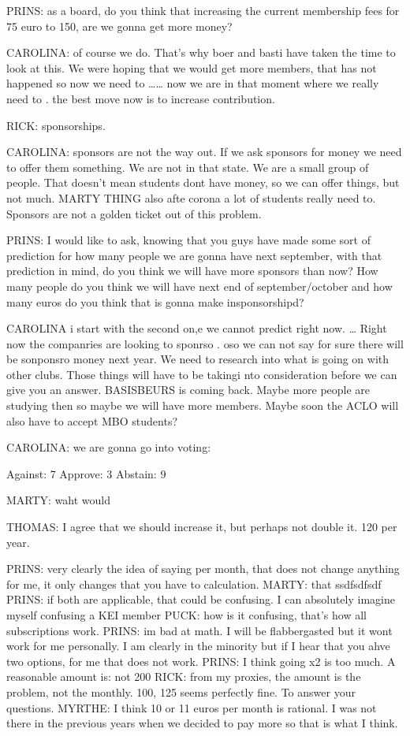 \documentclass[12pt, a4paper]{article}
\begin{document}
PRINS: as a board, do you think that increasing the current membership fees for 75 euro to 150, are we gonna get more money?

CAROLINA: of course we do. That’s why boer and basti have taken the time to look at this. We were hoping that we would get more members, that has not happened so now we need to …… now we are in that moment where we really need to . the best move now is to increase contribution. 

RICK: sponsorships. 

CAROLINA: sponsors are not the way out. If we ask sponsors for money we need to offer them something. We are not in that state. We are a small group of people. That doesn’t mean students dont have money, so we can offer things, but not much. MARTY THING also afte corona a lot of students really need to. Sponsors are not a golden ticket out of this problem.

PRINS: I would like to ask, knowing that you guys have made some sort of prediction for how many people we are gonna have next september, with that prediction in mind, do you think we will have more sponsors than now? How many people do you think we will have next end of september/october and how many euros do you think that is gonna make insponsorshipd?

CAROLINA i start with the second on,e we cannot predict right now. … Right now the companries are looking to sponrso . oso we can not say for sure there will be  sonponsro money next year. We need to research into what is going on with other clubs. Those things will have to be takingi nto consideration before we can give you an answer. BASISBEURS is coming back. Maybe more people are studying then so maybe we will have more members. Maybe soon the ACLO will also have to accept MBO students?

CAROLINA: we are gonna go into voting:

Against: 7
Approve: 3 
Abstain: 9

MARTY: waht would

THOMAS: I agree that we should increase it, but perhaps not double it. 120 per year.

PRINS: very clearly the idea of saying per month, that does not change anything for me, it only changes that you have to calculation.
MARTY: that ssdfsdfsdf
PRINS: if both are applicable, that could be confusing. I can absolutely imagine myself confusing a KEI member
PUCK: how is it confusing, that’s how all subscriptions work.
PRINS: im bad at math. I will be flabbergasted but it wont work for me personally. I am clearly in the minority but if I hear that you ahve two options, for me that does not work.
PRINS: I think going x2 is too much. A reasonable amount is: not 200%
RICK: from my proxies, the amount is the problem, not the monthly. 100, 125 seems perfectly fine. To answer your questions.
MYRTHE: I think 10 or 11 euros per month is rational. I was not  there in the previous years when we decided to pay more so that is what I think.
\end{document}
